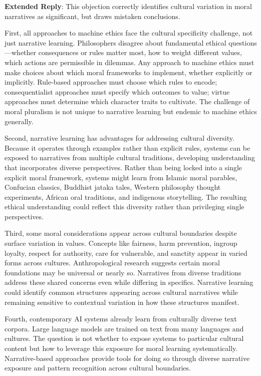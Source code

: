 \documentclass[12pt]{article}
\begin{document}
\textbf{Extended Reply}: This objection correctly identifies cultural variation in moral narratives as significant, but draws mistaken conclusions.

First, all approaches to machine ethics face the cultural specificity challenge, not just narrative learning. Philosophers disagree about fundamental ethical questions---whether consequences or rules matter most, how to weight different values, which actions are permissible in dilemmas. Any approach to machine ethics must make choices about which moral frameworks to implement, whether explicitly or implicitly. Rule-based approaches must choose which rules to encode; consequentialist approaches must specify which outcomes to value; virtue approaches must determine which character traits to cultivate. The challenge of moral pluralism is not unique to narrative learning but endemic to machine ethics generally.

Second, narrative learning has advantages for addressing cultural diversity. Because it operates through examples rather than explicit rules, systems can be exposed to narratives from multiple cultural traditions, developing understanding that incorporates diverse perspectives. Rather than being locked into a single explicit moral framework, systems might learn from Islamic moral parables, Confucian classics, Buddhist jataka tales, Western philosophy thought experiments, African oral traditions, and indigenous storytelling. The resulting ethical understanding could reflect this diversity rather than privileging single perspectives.

Third, some moral considerations appear across cultural boundaries despite surface variation in values. Concepts like fairness, harm prevention, ingroup loyalty, respect for authority, care for vulnerable, and sanctity appear in varied forms across cultures. Anthropological research suggests certain moral foundations may be universal or nearly so. Narratives from diverse traditions address these shared concerns even while differing in specifics. Narrative learning could identify common structures appearing across cultural narratives while remaining sensitive to contextual variation in how these structures manifest.

Fourth, contemporary AI systems already learn from culturally diverse text corpora. Large language models are trained on text from many languages and cultures. The question is not whether to expose systems to particular cultural content but how to leverage this exposure for moral learning systematically. Narrative-based approaches provide tools for doing so through diverse narrative exposure and pattern recognition across cultural boundaries.
\end{document}
